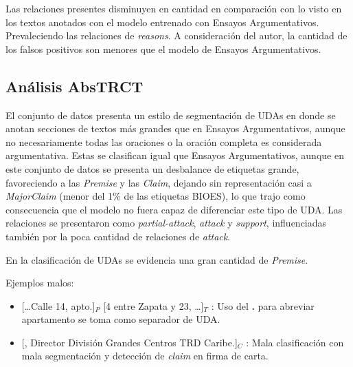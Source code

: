 Las relaciones presentes disminuyen en cantidad en comparación con lo visto en los textos anotados con el modelo 
entrenado con Ensayos Argumentativos. Prevaleciendo las relaciones de \emph{reasons}. A consideración del autor,
la cantidad de los falsos positivos son menores que el modelo de Ensayos Argumentativos.

\subsection{Análisis AbsTRCT}


El conjunto de datos presenta un estilo de segmentación de UDAs en donde se anotan 
secciones de textos más grandes que en Ensayos Argumentativos, aunque no necesariamente 
todas las oraciones o la oración completa es considerada argumentativa. 
Estas se clasifican igual que Ensayos Argumentativos, aunque 
en este conjunto de datos se presenta un desbalance de etiquetas grande, favoreciendo 
a las \emph{Premise} y las \emph{Claim}, dejando sin representación casi a \emph{MajorClaim}
(menor del 1\% de las etiquetas BIOES), lo que trajo como consecuencia que el modelo no fuera 
capaz de diferenciar este tipo de UDA. Las relaciones se presentaron como \emph{partial-attack},
\emph{attack} y \emph{support}, influenciadas también por la poca cantidad de relaciones de \emph{attack}.

En la clasificación de UDAs se evidencia una gran cantidad de \emph{Premise}.

Ejemplos malos:
\begin{itemize}
	\item \text{} [\dots Calle 14, apto.]$_P$ [4 entre Zapata y 23, \dots]$_T$ 
	: Uso del \textbf{.} para abreviar apartamento se toma como separador de UDA. %
	\item \text{} [, Director División Grandes Centros TRD Caribe.]$_C$ 
	: Mala clasificación con mala segmentación y detección de \emph{claim} en firma de carta. 
\end{itemize}

